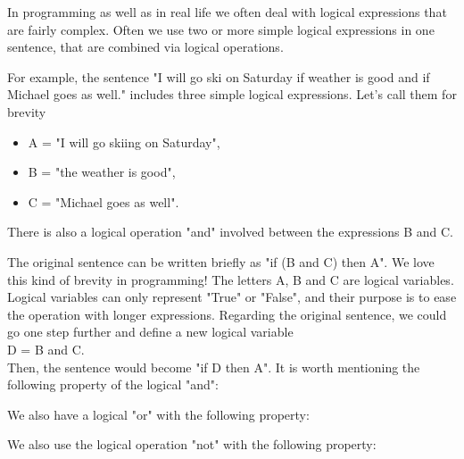 \documentclass[article,A4,12pt]{llncs}
\begin{document}
In programming as well as in real life we often deal with logical expressions that are 
fairly complex. Often we use two or more simple logical expressions in one sentence, that 
are combined via logical operations.

For example, the sentence "I will go ski on Saturday if weather is good and if 
Michael goes as well." includes three simple logical expressions. Let's call 
them for brevity

\begin{itemize}
\item A = "I will go skiing on Saturday",
\item B = "the weather is good",
\item C = "Michael goes as well".  
\end{itemize}
There is also a logical operation "and" involved between the expressions B and C.

The original sentence can be written briefly as "if (B and C) then A". We love this kind of 
brevity in programming! The letters A, B and C are logical variables. Logical variables 
can only represent "True" or "False", and their purpose is to ease the operation with 
longer expressions.
Regarding the original sentence, we could go one step further and define a new logical variable\\

\noindent
D = B and C.\\

\noindent
Then, the sentence would become "if D then A". It is worth mentioning the following 
property of the logical "and":\\

\begin{center}
\end{center}
\vspace{4mm}
\noindent
We also have a logical "or" with the following property:\\

\begin{center}
\end{center}
\vspace{4mm}
\noindent
We also use the logical operation "not" with the following property:\\

\begin{center}
\end{center}
\end{document}
